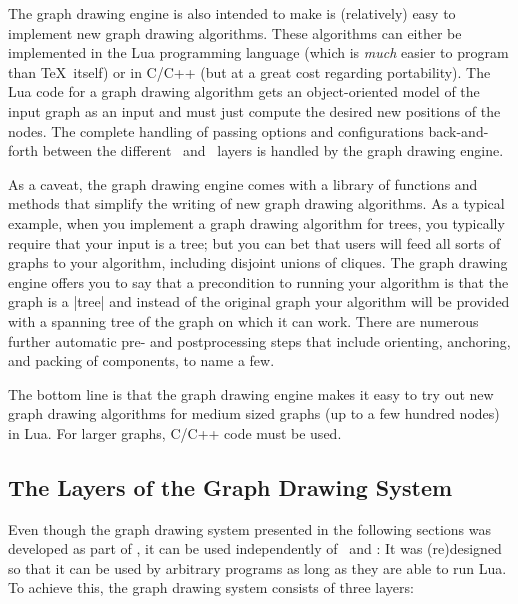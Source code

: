 The graph drawing engine is also intended to make is
(relatively) easy to implement new graph drawing algorithms. These
algorithms can either be implemented in the Lua programming
language (which is \emph{much} easier to program than \TeX\
itself) or in C/C++ (but at a great cost regarding portability). The
Lua code for a graph drawing algorithm gets an 
object-oriented model of the input graph as an input and must just
compute the desired new positions of the nodes. The complete
handling of passing options and configurations back-and-forth
between the different \tikzname\ and \pgfname\ layers is handled by
the graph drawing engine. 

As a caveat, the graph drawing engine comes with a library of
functions and methods that simplify the writing of new
graph drawing algorithms. As a typical example, when you implement a 
graph drawing algorithm for trees, you typically require that your
input is a tree; but you can bet that users will feed all sorts of
graphs to your algorithm, including disjoint unions of cliques. The
graph drawing engine offers you to say that a precondition to running
your algorithm is that the graph is a |tree| and instead of the original graph your
algorithm will be provided with a spanning tree of the graph on
which it can work. There are numerous further automatic pre- and
postprocessing steps that include orienting, anchoring, and packing
of components, to name a few.

The bottom line is that the graph drawing engine makes it easy
to try out new graph drawing algorithms for medium sized graphs (up
to a few hundred nodes) in Lua. For larger graphs, C/C++ code must be
used.



\subsection{The Layers of the Graph Drawing System}

\label{section-gd-layers}

Even though the graph drawing system presented in the following
sections was developed as part of \pgfname, it can be used
independently of \pgfname\ and \tikzname: It was (re)designed so that
it can be used by arbitrary programs as long as they are able to run
Lua. To achieve this, the graph drawing system consists of three
layers:

